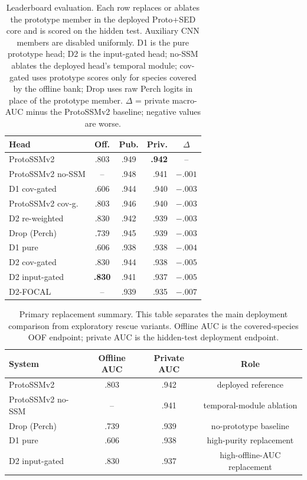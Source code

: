 \documentclass{ceurart}
\begin{document}
\begin{table}[t]
\caption{Leaderboard evaluation. Each row replaces or ablates the prototype member in the deployed Proto+SED core and is scored on the hidden test. Auxiliary CNN members are disabled uniformly. D1 is the pure prototype head; D2 is the input-gated head; no-SSM ablates the deployed head's temporal module; cov-gated uses prototype scores only for species covered by the offline bank; Drop uses raw Perch logits in place of the prototype member. $\Delta$ = private macro-AUC minus the ProtoSSMv2 baseline; negative values are worse.}
\label{tab:leaderboard}
\begin{tabular}{lccrc}
\toprule
Head & Off. & Pub. & Priv. & $\Delta$ \\
\midrule
ProtoSSMv2          & .803 & .949 & \textbf{.942} & -- \\
ProtoSSMv2 no-SSM   & --   & .948 & .941 & $-.001$ \\
D1 cov-gated        & .606 & .944 & .940 & $-.003$ \\
ProtoSSMv2 cov-g.   & .803 & .946 & .940 & $-.003$ \\
D2 re-weighted      & .830 & .942 & .939 & $-.003$ \\
Drop (Perch)        & .739 & .945 & .939 & $-.003$ \\
D1 pure             & .606 & .938 & .938 & $-.004$ \\
D2 cov-gated        & .830 & .944 & .938 & $-.005$ \\
D2 input-gated      & \textbf{.830} & .941 & .937 & $-.005$ \\
D2-FOCAL            & --  & .939 & .935 & $-.007$ \\
\bottomrule
\end{tabular}
\end{table}


\begin{table}[t]
\caption{Primary replacement summary. This table separates the main deployment comparison from exploratory rescue variants. Offline AUC is the covered-species OOF endpoint; private AUC is the hidden-test deployment endpoint.}
\label{tab:primary_summary}
\begin{tabular}{lccc}
\toprule
System & Offline AUC & Private AUC & Role \\
\midrule
ProtoSSMv2          & .803 & .942 & deployed reference \\
ProtoSSMv2 no-SSM   & --   & .941 & temporal-module ablation \\
Drop (Perch)        & .739 & .939 & no-prototype baseline \\
D1 pure             & .606 & .938 & high-purity replacement \\
D2 input-gated      & .830 & .937 & high-offline-AUC replacement \\
\bottomrule
\end{tabular}
\end{table}
\end{document}

